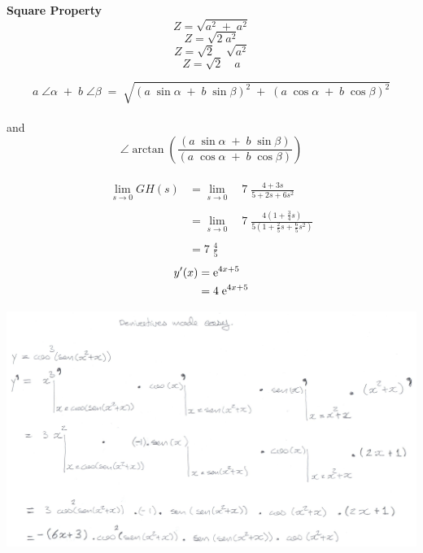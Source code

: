 \begin{minipage}[H]{0.3\linewidth}
\textbf{Square Property} \\
\[Z=\sqrt{a^2 \; + \; a^2}\]
\[Z=\sqrt{2 \; a^2}\]
\[Z=\sqrt{2} \quad \sqrt{a^2}\]
\[Z=\sqrt{2} \quad a\]
\end{minipage}
\vspace{1cm}
\[a \; \angle \alpha \; + \; b \; \angle \beta \; = \; \sqrt{(a \;  \sin \alpha \; + \; b \; \sin \beta)^2 \; + \; (a \; \cos \alpha \; + \; b \; \cos \beta)^2}\] \\
and \\
\[\angle \arctan(\frac{(a \; \sin \alpha \; + \; b \; \sin \beta)}{(a \; \cos \alpha \; + \; b \; \cos \beta)})\] \\
\begin{align*}
\lim_{s \to 0}{GH(s)} & = \lim_{s \to 0} \quad 7 \; \frac{4+3s}{5+2s+6s^2} \\ \\
& = \lim_{s \to 0} \quad 7 \; \frac{4(1+\frac{3}{4}s)}{5(1+\frac{2}{5}s+\frac{6}{5}s^2)} \\ \\
& = 7 \; \frac{4}{5}
\end{align*}
\begin{align*}
y'(x) &= \mathrm{e}^{4x+5} \\
      &= 4 \; \mathrm{e}^{4x+5}
\end{align*}
\begin{minipage}{0.80\linewidth}
\includegraphics[scale=0.18]{./image/examples/derivativeasy_1.jpg}
\end{minipage}\\
